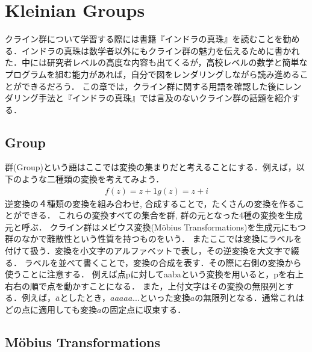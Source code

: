 
\section{Kleinian Groups}
クライン群について学習する際には書籍『インドラの真珠』\cite{indra}を読むことを勧める．インドラの真珠は数学者以外にもクライン群の魅力を伝えるために書かれた．中には研究者レベルの高度な内容も出てくるが，高校レベルの数学と簡単なプログラムを組む能力があれば，自分で図をレンダリングしながら読み進めることができるだろう．
この章では，クライン群に関する用語を確認した後にレンダリング手法と『インドラの真珠』では言及のないクライン群の話題を紹介する．

\subsection{Group}
群(Group)という語はここでは変換の集まりだと考えることにする．例えば，以下のような二種類の変換を考えてみよう．
\begin{eqnarray*}
 f(z) = z + 1
 g(z) = z + i
\end{eqnarray*}
逆変換の４種類の変換を組み合わせ, 合成することで，たくさんの変換を作ることができる．
これらの変換すべての集合を群, 群の元となった4種の変換を生成元と呼ぶ．
クライン群はメビウス変換(M\"obius Transformations)を生成元にもつ群のなかで離散性という性質を持つものをいう．
またここでは変換にラベルを付けて扱う．変換を小文字のアルファベットで表し，その逆変換を大文字で綴る．
ラベルを並べて書くことで，変換の合成を表す．その際に右側の変換から使うことに注意する．
例えば点pに対してaabaという変換を用いると，pを右上右右の順で点を動かすことになる．
また，上付文字はその変換の無限列とする．例えば，$\overline{a}$としたとき，$aaaaa...$といった変換$a$の無限列となる．通常これはどの点に適用しても変換$a$の固定点に収束する．


\subsection{M\"obius Transformations}

